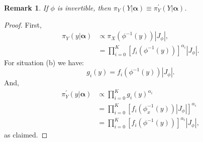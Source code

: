 \documentclass[a4paper, notitlepage, 10pt]{article}
\newtheorem{remark}{Remark}[]
\begin{document}
\begin{remark}
\label{rmk:invariance}
If $\phi$ is invertible, then $\pi_Y(Y | \boldsymbol \alpha) \equiv \pi_Y^{\prime}(Y|  \boldsymbol \alpha)$.
\end{remark}
\begin{proof}
First, 
\begin{align}
 \pi_Y(y | \boldsymbol \alpha) & \propto \pi_{X}(\phi^{-1}(y))|J_\phi|, \\
&= \prod_{i = 0}^K \left[ f_i(\phi^{-1}(y)) \right]^{\alpha_i}|J_\phi|.
\end{align}
For situation (b) we have:
\begin{equation}
 g_i(y) = f_i(\phi^{-1}(y))|J_\phi|.
\end{equation}
And,
\begin{align}
 \pi_Y^{\prime}(y |  \boldsymbol \alpha) & \propto  \prod_{i=0}^K g_i(y)^{\alpha_i} \\
  & =  \prod_{i=0}^K \left[ f_i(\phi_x^{-1}(y))|J_\phi| \right]^{\alpha_i} \\
  & = \prod_{i = 0}^K \left[ f_i(\phi^{-1}(y)) \right]^{\alpha_i}|J_\phi|,
\end{align}
as claimed.
\end{proof}
\end{document}
